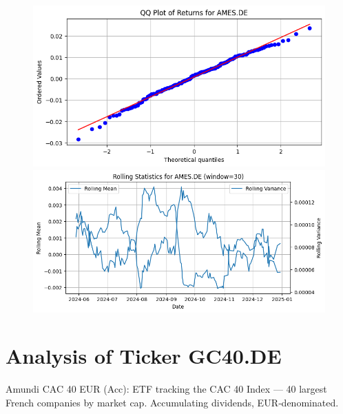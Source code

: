 \documentclass{article}%
\begin{document}
%


\begin{figure}[htbp]%
\begin{minipage}{0.48\textwidth}%
\includegraphics[width=\linewidth]{ticker_images/AMES.DE_qq_plot.png}%
\end{minipage}%
\begin{minipage}{0.48\textwidth}%
\includegraphics[width=\linewidth]{ticker_images/AMES.DE_rolling_stats.png}%
\end{minipage}%
\end{figure}

%
\section*{Analysis of Ticker GC40.DE}%
\label{sec:AnalysisofTickerGC40.DE}%
Amundi CAC 40 EUR (Acc): ETF tracking the CAC 40 Index — 40 largest French companies by market cap. Accumulating dividends, EUR‑denominated.%
\end{document}
